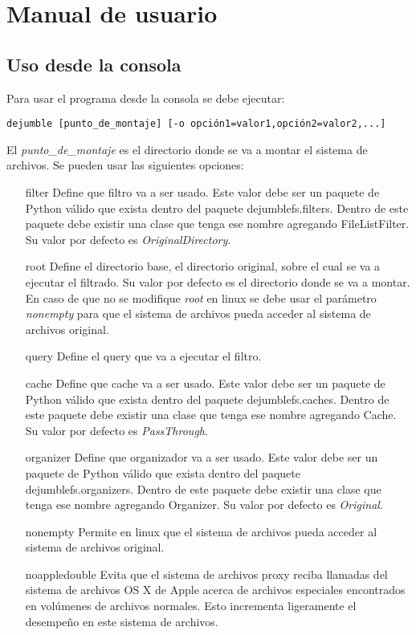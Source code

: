 \chapter{Manual de usuario}
\ifpdf
    \graphicspath{{Appendix2/Appendix2Figs/PNG/}{Appendix2/Appendix2Figs/PDF/}{Appendix2/Appendix2Figs/}}
\else
    \graphicspath{{Appendix2/Appendix2Figs/EPS/}{Appendix2/Appendix2Figs/}}
\fi

\section{Uso desde la consola}

Para usar el programa desde la consola se debe ejecutar:

\begin{verbatim}
dejumble [punto_de_montaje] [-o opción1=valor1,opción2=valor2,...]
\end{verbatim}

El \textit{punto\_de\_montaje} es el directorio donde se va a montar el sistema de archivos. Se pueden usar las siguientes opciones:

\begin{itemize}
\item[filter] Define que filtro va a ser usado. Este valor debe ser un paquete de Python válido que exista dentro del paquete dejumblefs.filters. Dentro de este paquete debe existir una clase que tenga ese nombre agregando FileListFilter. Su valor por defecto es \textit{OriginalDirectory}.
\item[root] Define el directorio base, el directorio original, sobre el cual se va a ejecutar el filtrado. Su valor por defecto es el directorio donde se va a montar. En caso de que no se modifique \textit{root} en linux se debe usar el parámetro \textit{nonempty} para que el sistema de archivos pueda acceder al sistema de archivos original.
\item[query] Define el query que va a ejecutar el filtro.
\item[cache] Define que cache va a ser usado. Este valor debe ser un paquete de Python válido que exista dentro del paquete dejumblefs.caches. Dentro de este paquete debe existir una clase que tenga ese nombre agregando Cache. Su valor por defecto es \textit{PassThrough}.
\item[organizer] Define que organizador va a ser usado. Este valor debe ser un paquete de Python válido que exista dentro del paquete dejumblefs.organizers. Dentro de este paquete debe existir una clase que tenga ese nombre agregando Organizer. Su valor por defecto es \textit{Original}.
\item[nonempty] Permite en linux que el sistema de archivos pueda acceder al sistema de archivos original.
\item[noappledouble] Evita que el sistema de archivos proxy reciba llamadas del sistema de archivos OS X de Apple acerca de archivos especiales encontrados en volúmenes de archivos normales. Esto incrementa ligeramente el desempeño en este sistema de archivos.
\end{itemize}

